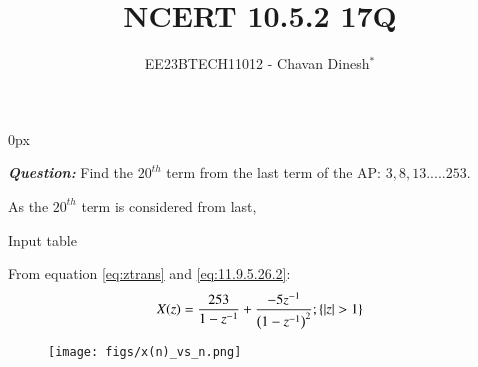 \documentclass[journal,12pt,twocolumn]{IEEEtran}
\theoremstyle{remark}
\begin{document}
\parindent 0px

\vspace{3cm}

\title{NCERT 10.5.2 17Q}
\author{EE23BTECH11012 - Chavan Dinesh$^{*}$%
}
\maketitle
\newpage
\bigskip

\renewcommand{\thefigure}{\arabic{figure}}
\renewcommand{\thetable}{\arabic{table}}
\large\textbf{\textsl{Question:}}
Find the $20^{th}$ term from the last term of the AP: $3,8,13.....253$.

\solution

As the $20^{th}$ term is considered from last, 

\begin{table}[htbp]
    \centering
    
    \caption{Input table}
    \label{tab:parameter_table.10.5.2.17}
\end{table}

From equation \eqref{eq:ztrans} and \eqref{eq:11.9.5.26.2}:
\begin{align}
 X(z) =\frac{253}{1-z^{-1}}+ \frac{-5z^{-1}}{\brak{1-z^{-1}}^2};\cbrak{|z|>1}
\end{align}

\begin{figure}[ht]
    \centering
    \texttt{[image: figs/x(n)\_vs\_n.png]}
    \caption{}
    \label{fig:graph1.10.5.2.17}
\end{figure}


\end{document}
